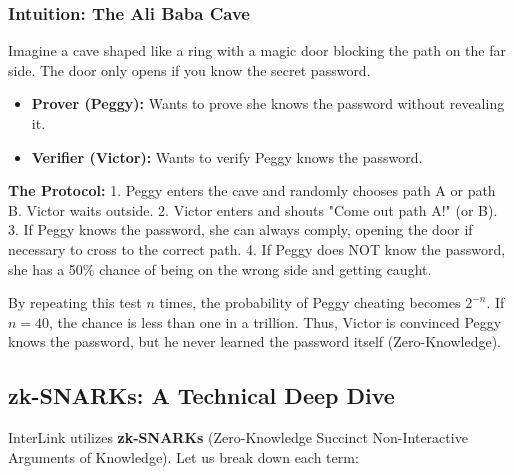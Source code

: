 \documentclass[11pt,a4paper]{article}
\begin{document}
\subsubsection{Intuition: The Ali Baba Cave}
Imagine a cave shaped like a ring with a magic door blocking the path on the far side. The door only opens if you know the secret password.
\begin{itemize}
    \item \textbf{Prover (Peggy):} Wants to prove she knows the password without revealing it.
    \item \textbf{Verifier (Victor):} Wants to verify Peggy knows the password.
\end{itemize}
\textbf{The Protocol:}
1. Peggy enters the cave and randomly chooses path A or path B. Victor waits outside.
2. Victor enters and shouts "Come out path A!" (or B).
3. If Peggy knows the password, she can always comply, opening the door if necessary to cross to the correct path.
4. If Peggy does NOT know the password, she has a 50\% chance of being on the wrong side and getting caught.

By repeating this test $n$ times, the probability of Peggy cheating becomes $2^{-n}$. If $n=40$, the chance is less than one in a trillion. Thus, Victor is convinced Peggy knows the password, but he never learned the password itself (Zero-Knowledge).

\subsection{zk-SNARKs: A Technical Deep Dive}
InterLink utilizes \textbf{zk-SNARKs} (Zero-Knowledge Succinct Non-Interactive Arguments of Knowledge). Let us break down each term:
\end{document}
